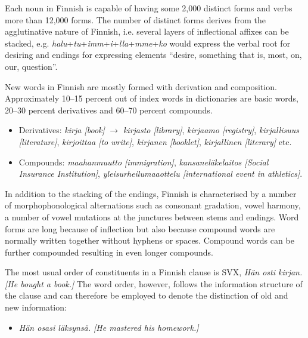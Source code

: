 \documentclass[]{../../metanetpaper}
\begin{document}
\begin{Parallel}[c]{70mm}{70mm}
{Each noun in Finnish is capable of having some 2,000 distinct forms
and verbs more than 12,000 forms. The number of distinct forms derives
from the agglutinative nature of Finnish, i.e. several layers of
inflectional affixes can be stacked,
e.g. \textit{halu}+\textit{tu}+\textit{imm}+\textit{i}+\textit{lla}+\textit{mme}+\textit{ko}
would express the verbal root for desiring and endings for expressing
elements “desire, something that is, most, on, our, question”.

New words in Finnish are mostly formed with derivation and composition.
Approximately 10–15 percent out of index words in dictionaries are basic words,
20–30 percent derivatives and 60–70 percent compounds.
\begin{itemize}
\item Derivatives:
   \textit{\foreignlanguage{finnish}{\textit{kirja}} [book]} $\to$
   \textit{\foreignlanguage{finnish}{\textit{kirjasto}} [library]},
   \textit{\foreignlanguage{finnish}{\textit{kirjaamo}} [registry]},
   \textit{\foreignlanguage{finnish}{\textit{kirjallisuus}} [literature]},
   \textit{\foreignlanguage{finnish}{\textit{kirjoittaa}} [to write]},
   \textit{\foreignlanguage{finnish}{\textit{kirjanen}} [booklet]},
   \textit{\foreignlanguage{finnish}{\textit{kirjallinen}} [literary]} etc.

\item Compounds:
   \textit{\foreignlanguage{finnish}{\textit{maahanmuutto}} [immigration]},
   \textit{\foreignlanguage{finnish}{\textit{kansaneläkelaitos}}
           [Social Insurance Institution]},
   \textit{\foreignlanguage{finnish}{\textit{yleisurheilumaaottelu}}
           [international event in athletics]}.
\end{itemize}

In addition to the stacking of the endings, Finnish is characterised by a
number of morphophonological alternations such as consonant gradation, vowel
harmony, a number of vowel mutations at the junctures between stems and
endings. Word forms are long because of inflection but also because compound
words are normally written together without hyphens or spaces. Compound words
can be further compounded resulting in even longer compounds.

The most usual order of constituents in a Finnish clause is SVX,
\textit{\foreignlanguage{finnish}{\textit{Hän osti kirjan.}}
        [He bought a book.]}
The word order, however, follows the
information structure of the clause and can therefore be employed to denote the
distinction of old and new information:
\begin{itemize}
\item \textit{\foreignlanguage{finnish}{\textit{Hän osasi läksynsä.}}
              [He mastered his homework.]}


\end{itemize}}
\end{Parallel}
\end{document}
